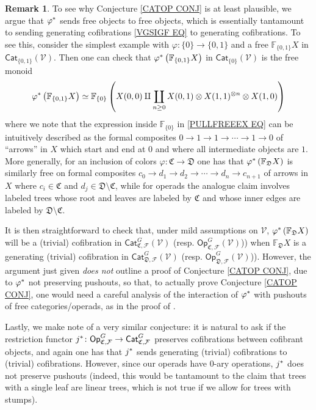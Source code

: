\documentclass[a4paper,10pt
,draft
]{article}%
\numberwithin{equation}{section}
\numberwithin{figure}{section}
\theoremstyle{definition} %
\newtheorem{remark}[equation]{Remark}%
\newcommand{\F}{\ensuremath{\mathcal F}}
\newcommand{\V}{\ensuremath{\mathcal V}}
\newcommand{\1}{\ensuremath{\mathbbm 1}}%
\begin{document}
\begin{remark}
To see why Conjecture \ref{CATOP CONJ} is at least plausible,
we argue that $\varphi^{\**}$ sends free objects to free objects, 
which is essentially tantamount to
sending generating cofibrations \eqref{VGSIGF EQ} to generating cofibrations.
%
To see this, consider the simplest example 
with
$\varphi \colon \{0\} \to \{0,1\}$
and a free $\mathbb{F}_{\{0,1\}}X $ in $\mathsf{Cat}_{\{0,1\}}(\V)$.
Then one can check that 
$\varphi^{\**} \left( \mathbb{F}_{\{0,1\}}X \right)$ in $\mathsf{Cat}_{\{0\}}(\V)$ is the free monoid
\begin{equation}\label{PULLFREEEX EQ}
	\varphi^{\**} \left( \mathbb{F}_{\{0,1\}}X \right)
\simeq
	\mathbb{F}_{\{0\}}
	\left(X(0,0) \amalg 
	\coprod_{n \geq 0}
	X(0,1)\otimes X(1,1)^{\otimes n} \otimes X(1,0) 
	\right)
\end{equation}
where we note that the expression inside
$\mathbb{F}_{\{0\}}$
in \eqref{PULLFREEEX EQ}
can be intuitively described as the formal composites
$0 \to 1 \to 1 \to \cdots \to 1 \to 0$
of ``arrows'' in $X$ which start and end at $0$ and where all intermediate objects are $1$.
%
More generally, for an inclusion of colors 
$\varphi \colon \mathfrak{C} \to \mathfrak{D}$
one has that 
$\varphi^{\**} \left(\mathbb{F}_{\mathfrak{D}} X\right)$
is similarly free on formal composites
$c_0 \to d_1 \to d_2 \to \cdots \to d_n \to c_{n+1}$
of arrows in $X$
where $c_i \in \mathfrak{C}$
and $d_j \in \mathfrak{D} \setminus \mathfrak{C}$,
while for operads the analogue claim involves labeled trees whose root and leaves are labeled by $\mathfrak{C}$
and whose inner edges are labeled by 
$\mathfrak{D} \setminus \mathfrak{C}$.
 
It is then straightforward to check that, under mild assumptions on $\V$,
$\varphi^{\**} \left(\mathbb{F}_{\mathfrak{D}} X \right)$
will be a (trivial) cofibration in 
$\mathsf{Cat}^G_{\mathfrak{C},\F}(\V)$
(resp. $\mathsf{Op}^G_{\mathfrak{C},\F}(\V)$))
when $\mathbb{F}_{\mathfrak{D}} X$
is a generating (trivial) cofibration
in $\mathsf{Cat}^G_{\mathfrak{D},\F}(\V)$
(resp. $\mathsf{Op}^G_{\mathfrak{D},\F}(\V)$)).
However, the argument just given \emph{does not} outline a proof of Conjecture \ref{CATOP CONJ},
due to $\varphi^{\**}$ not preserving pushouts, 
so that, to actually prove Conjecture \ref{CATOP CONJ},
one would need a careful analysis of the interaction of $\varphi^{\**}$ with pushouts of free categories/operads, 
as in the proof of \cite[Thm. 1.15]{BM13}.

Lastly, we make note of a very similar conjecture:
it is natural to ask if the restriction functor
$j^{\**} \colon \mathsf{Op}_{\mathfrak{C},\F}^G 
\to \mathsf{Cat}_{\mathfrak{C},\F}^G$
preserves cofibrations between cofibrant objects,
and again one has that $j^{\**}$ 
sends generating (trivial) cofibrations to (trivial) cofibrations.
However, since our operads have $0$-ary operations, %
$j^{\**}$ does not preserve pushouts
(indeed, this would be tantamount to the claim that trees with a single leaf are linear trees, which is not true if we allow for trees with stumps).
\end{remark}
\end{document}

